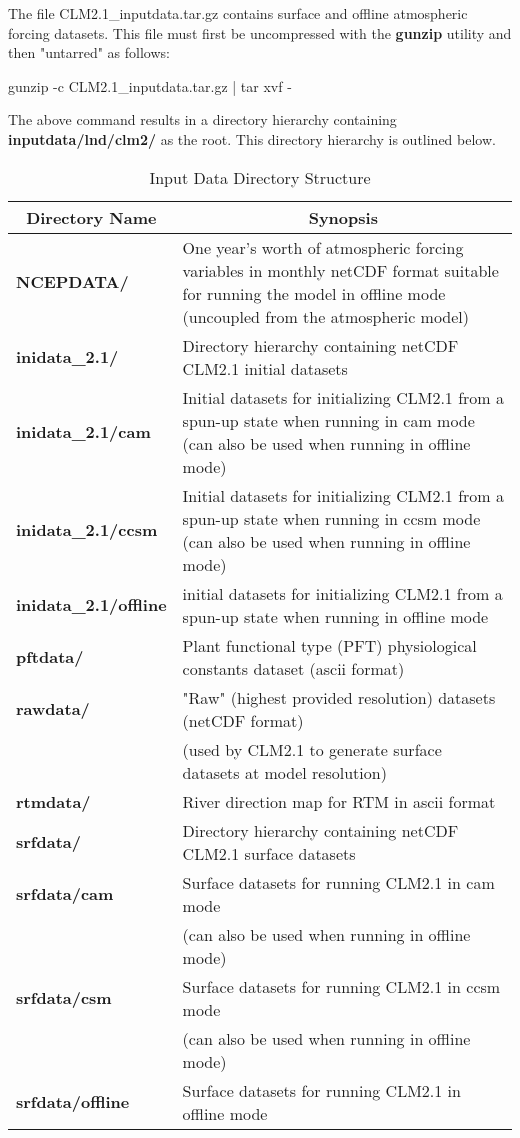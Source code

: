 \bigskip
The file CLM2.1\_inputdata.tar.gz contains surface and offline
atmospheric forcing datasets. This file must first be uncompressed
with the {\bf gunzip} utility and then "untarred" as follows:
\bigskip

	gunzip -c CLM2.1\_inputdata.tar.gz | tar xvf -

\bigskip
The above command results in a directory hierarchy containing {\bf
inputdata/lnd/clm2/} as the root.  This directory hierarchy is
outlined below.
\bigskip

\begin{longtable}{|p{1.5in}|p{4.5in}|}
\caption{\label{inputdata_directory} Input Data Directory Structure} \\
\hline
\endhead
\hline
\multicolumn{1}{|c|}{\bf Directory Name} & 
\multicolumn{1}{|c|}{\bf Synopsis}  \\ \hline 
{\bf NCEPDATA/}        & One year's worth of atmospheric forcing variables
                         in monthly netCDF format suitable for running the model
                         in offline mode (uncoupled from the atmospheric model)  \\ \hline
{\bf inidata\_2.1/}    & Directory hierarchy containing netCDF CLM2.1 initial datasets \\ \hline
{\bf inidata\_2.1/cam} & Initial datasets for initializing CLM2.1 from a spun-up state when
                         running in cam mode (can also be used when running in offline mode) \\ \hline
{\bf inidata\_2.1/ccsm}& Initial datasets for initializing CLM2.1 from a spun-up state when
                         running in ccsm mode (can also be used when running in offline mode) \\ \hline
{\bf inidata\_2.1/offline} & initial datasets for initializing CLM2.1 from a spun-up state when
                             running in offline mode \\ \hline
{\bf pftdata/}         & Plant functional type (PFT) physiological constants
                         dataset (ascii format) \\ \hline
{\bf rawdata/}         & "Raw" (highest provided resolution) datasets (netCDF format) \\ 
                       & (used by CLM2.1 to generate surface datasets at model resolution) \\ \hline 
{\bf rtmdata/}         & River direction map for RTM in ascii format \\ \hline
{\bf srfdata/}         & Directory hierarchy containing netCDF CLM2.1 surface datasets \\ \hline
{\bf srfdata/cam}      & Surface datasets for running CLM2.1 in cam mode \\ 
                       & (can also be used when running in offline mode) \\ \hline
{\bf srfdata/csm}      & Surface datasets for running CLM2.1 in ccsm mode \\ 
                       & (can also be used when running in offline mode) \\ \hline
{\bf srfdata/offline}  & Surface datasets for running CLM2.1 in offline mode \\ \hline
\end{longtable}

\bigskip

